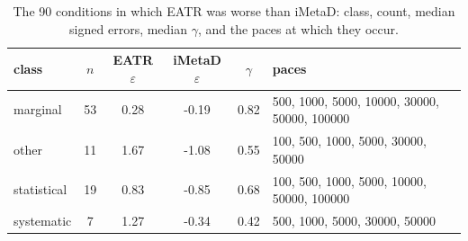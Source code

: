 \begin{table}[H]\centering
\caption{The 90 conditions in which EATR was worse than iMetaD: class, count, median signed errors, median $\gamma$, and the paces at which they occur.}\label{tab:s9}
\begin{tabular}{lccccp{}}\toprule
class & $n$ & EATR $\varepsilon$ & iMetaD $\varepsilon$ & $\gamma$ & paces\\ \midrule
marginal & 53 & 0.28 & -0.19 & 0.82 & 500, 1000, 5000, 10000, 30000, 50000, 100000 \\
other & 11 & 1.67 & -1.08 & 0.55 & 100, 500, 1000, 5000, 30000, 50000 \\
statistical & 19 & 0.83 & -0.85 & 0.68 & 100, 500, 1000, 5000, 10000, 50000, 100000 \\
systematic & 7 & 1.27 & -0.34 & 0.42 & 500, 1000, 5000, 30000, 50000\\ \bottomrule
\end{tabular}
\end{table}
